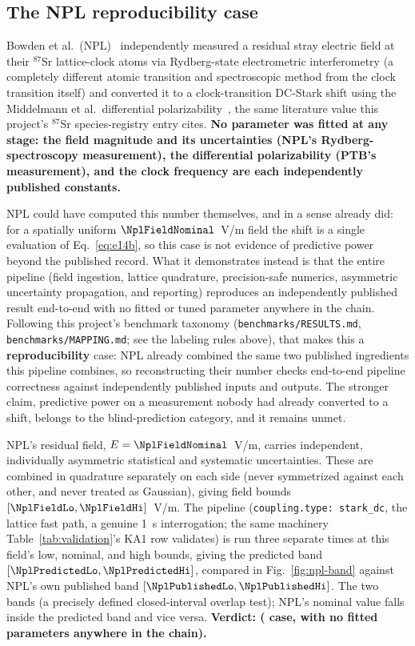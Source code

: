 \documentclass[aps,pra,superscriptaddress,groupedaddress,nofootinbib]{revtex4-2}
\begin{document}
\subsection{The NPL reproducibility case}
\label{sec:npl}

Bowden et al.\ (NPL)~\cite{Bowden2017} independently measured a residual
stray electric field at their $^{87}$Sr lattice-clock atoms via
Rydberg-state electrometric interferometry (a completely different
atomic transition and spectroscopic method from the clock transition
itself) and converted it to a clock-transition DC-Stark shift using
the Middelmann et al.\ differential
polarizability~\cite{Middelmann2012}, the same literature value this
project's $^{87}$Sr species-registry entry cites. \textbf{No parameter
was fitted at any stage: the field magnitude and its uncertainties
(NPL's Rydberg-spectroscopy measurement), the differential
polarizability (PTB's measurement), and the clock frequency are each
independently published constants.}

NPL could have computed this number themselves, and in a sense already
did: for a spatially uniform $\NplFieldNominal$~V/m field the shift is
a single evaluation of Eq.~\eqref{eq:e14b}, so this case is not
evidence of predictive power beyond the published record. What it
demonstrates instead is that the entire pipeline (field ingestion,
lattice quadrature, precision-safe numerics, asymmetric uncertainty
propagation, and reporting) reproduces an independently published
result end-to-end with no fitted or tuned parameter anywhere in the
chain. Following this project's benchmark taxonomy
(\texttt{benchmarks/RESULTS.md}, \texttt{benchmarks/MAPPING.md}; see
the labeling rules above), that makes this a
\textbf{reproducibility} case: NPL already combined the same two
published ingredients this pipeline combines, so reconstructing their
number checks end-to-end pipeline correctness against independently
published inputs and outputs. The stronger claim, predictive power on
a measurement nobody had already converted to a shift, belongs to the
blind-prediction category, and it remains unmet.

NPL's residual field, $E=\NplFieldNominal$~V/m, carries independent,
individually asymmetric statistical and systematic uncertainties. These
are combined in quadrature separately on each side (never symmetrized
against each other, and never treated as Gaussian), giving field bounds
$[\NplFieldLo,\NplFieldHi]$~V/m. The pipeline (\texttt{coupling.type:
stark\_dc}, the lattice fast path, a genuine 1~s interrogation; the
same machinery Table~\ref{tab:validation}'s KA1 row validates) is run
three separate times at this field's low, nominal, and high bounds,
giving the predicted band
$[\NplPredictedLo,\NplPredictedHi]$, compared in
Fig.~\ref{fig:npl-band} against NPL's own published band
$[\NplPublishedLo,\NplPublishedHi]$. The two bands
\NplBandsOverlap{} (a precisely defined closed-interval overlap test);
NPL's nominal value falls inside the predicted band and vice versa.
\textbf{Verdict: \textit{\NplVerdict{}} (\NplCaseClass{} case, with no fitted
parameters anywhere in the chain).}
\end{document}
